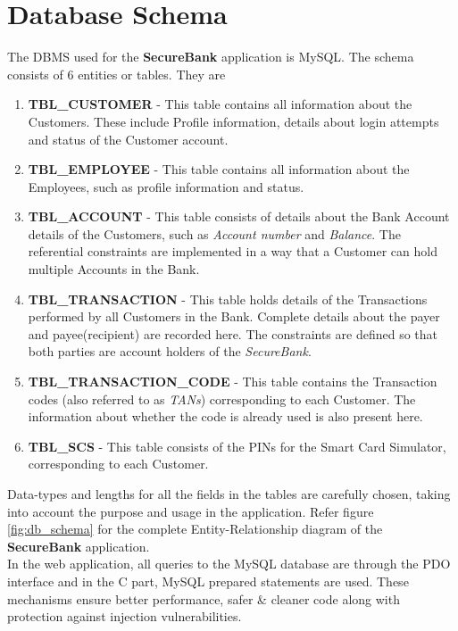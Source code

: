 \section{Database Schema} \label{section_db}

The DBMS used for the \textbf{SecureBank} application is MySQL. The schema consists of 6 entities or tables. They are 
\begin{enumerate}
\item \textbf{TBL\_CUSTOMER} - This table contains all information about the Customers. These include Profile information, details about login attempts and status of the Customer account.
\item \textbf{TBL\_EMPLOYEE} - This table contains all information about the Employees, such as profile information and status. 
\item \textbf{TBL\_ACCOUNT} - This table consists of details about the Bank Account details of the Customers, such as \textit{Account number} and \textit{Balance}. The referential constraints are implemented in a way that a Customer can hold multiple Accounts in the Bank.
\item \textbf{TBL\_TRANSACTION} - This table holds details of the Transactions performed by all Customers in the Bank. Complete details about the payer and payee(recipient) are recorded here. The constraints are defined so that both parties are account holders of the \textit{SecureBank}.
\item \textbf{TBL\_TRANSACTION\_CODE} - This table contains the Transaction codes (also referred to as \textit{TANs}) corresponding to each Customer. The information about whether the code is already used is also present here.
\item \textbf{TBL\_SCS} - This table consists of the PINs for the Smart Card Simulator, corresponding to each Customer.
\end{enumerate}


Data-types and lengths for all the fields in the tables are carefully chosen, taking into account the purpose and usage in the application. Refer figure \ref{fig:db_schema} for the complete Entity-Relationship diagram of the \textbf{SecureBank} application.\\

In the web application, all queries to the MySQL database are through the PDO interface and in the C part, MySQL prepared statements are used. These mechanisms ensure better performance, safer \& cleaner code along with protection against injection vulnerabilities.

